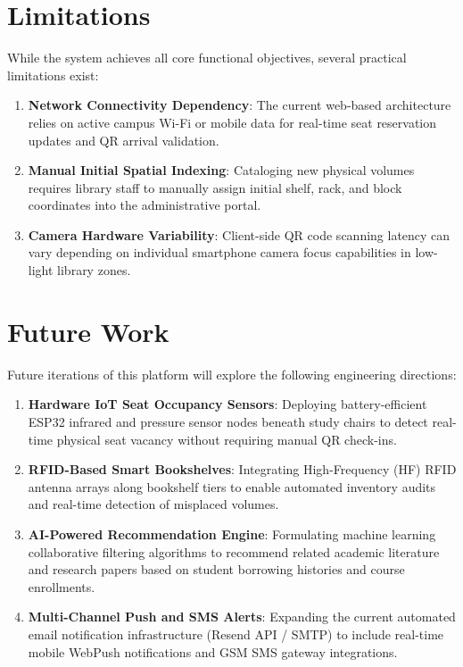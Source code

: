 \section{Limitations}
While the system achieves all core functional objectives, several practical limitations exist:
\begin{enumerate}
    \item \textbf{Network Connectivity Dependency}: The current web-based architecture relies on active campus Wi-Fi or mobile data for real-time seat reservation updates and QR arrival validation.
    \item \textbf{Manual Initial Spatial Indexing}: Cataloging new physical volumes requires library staff to manually assign initial shelf, rack, and block coordinates into the administrative portal.
    \item \textbf{Camera Hardware Variability}: Client-side QR code scanning latency can vary depending on individual smartphone camera focus capabilities in low-light library zones.
\end{enumerate}

\section{Future Work}
Future iterations of this platform will explore the following engineering directions:
\begin{enumerate}
    \item \textbf{Hardware IoT Seat Occupancy Sensors}: Deploying battery-efficient ESP32 infrared and pressure sensor nodes beneath study chairs to detect real-time physical seat vacancy without requiring manual QR check-ins.
    \item \textbf{RFID-Based Smart Bookshelves}: Integrating High-Frequency (HF) RFID antenna arrays along bookshelf tiers to enable automated inventory audits and real-time detection of misplaced volumes.
    \item \textbf{AI-Powered Recommendation Engine}: Formulating machine learning collaborative filtering algorithms to recommend related academic literature and research papers based on student borrowing histories and course enrollments.
    \item \textbf{Multi-Channel Push and SMS Alerts}: Expanding the current automated email notification infrastructure (Resend API / SMTP) to include real-time mobile WebPush notifications and GSM SMS gateway integrations.
\end{enumerate}

